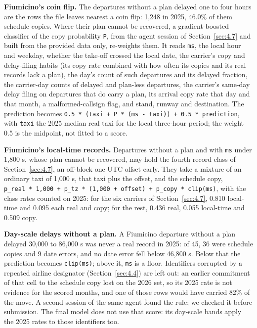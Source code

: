 \documentclass[
  manuscript=article,
  layout=preprint,
  year=2026,
  volume=x,
]{extra/joas}
\begin{document}
\textbf{Fiumicino's coin flip.} The departures without a plan delayed one to four hours are the rows the file leaves nearest a coin flip: 1,248 in 2025, 46.0\% of them schedule copies. Where their plan cannot be recovered, a gradient-boosted classifier of the copy probability \texttt{P}, from the agent session of Section~\ref{sec:4.7} and built from the provided data only, re-weights them. It reads \texttt{ms}, the local hour and weekday, whether the take-off crossed the local date, the carrier's copy and delay-filing habits (its copy rate combined with how often its copies and its real records lack a plan), the day's count of such departures and its delayed fraction, the carrier-day counts of delayed and plan-less departures, the carrier's same-day delay filing on departures that do carry a plan, its arrival copy rate that day and that month, a malformed-callsign flag, and stand, runway and destination. The prediction becomes \texttt{0.5\ *\ (taxi\ +\ P\ *\ (ms\ -\ taxi))\ +\ 0.5\ *\ prediction}, with \texttt{taxi} the 2025 median real taxi for the local three-hour period; the weight 0.5 is the midpoint, not fitted to a score.

\textbf{Fiumicino's local-time records.} Departures without a plan and with \texttt{ms} under 1,800 s, whose plan cannot be recovered, may hold the fourth record class of Section~\ref{sec:4.7}, an off-block one UTC offset early. They take a mixture of an ordinary taxi of 1,000 s, that taxi plus the offset, and the schedule copy, \texttt{p\_real\ *\ 1,000\ +\ p\_tz\ *\ (1,000\ +\ offset)\ +\ p\_copy\ *\ clip(ms)}, with the class rates counted on 2025: for the six carriers of Section~\ref{sec:4.7}, 0.810 local-time and 0.095 each real and copy; for the rest, 0.436 real, 0.055 local-time and 0.509 copy.

\textbf{Day-scale delays without a plan.} A Fiumicino departure without a plan delayed 30,000 to 86,000 s was never a real record in 2025: of 45, 36 were schedule copies and 9 date errors, and no date error fell below 46,800 s. Below that the prediction becomes \texttt{clip(ms)}; above it, \texttt{ms} is a floor. Identifiers corrupted by a repeated airline designator (Section~\ref{sec:4.4}) are left out: an earlier commitment of that cell to the schedule copy lost on the 2026 set, so its 2025 rate is not evidence for the scored months, and one of those rows would have carried 82\% of the move. A second session of the same agent found the rule; we checked it before submission. The final model does not use that score: its day-scale bands apply the 2025 rates to those identifiers too.
\end{document}
